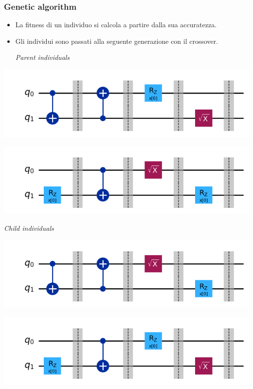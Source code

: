 \documentclass{beamer}
\begin{document}
\begin{frame}
  \frametitle{Genetic algorithm}
  \begin{itemize}
    \item La fitness di un individuo si calcola a partire dalla sua accuratezza.
    \item Gli individui sono passati alla seguente generazione con il crossover.
    \vspace{0.5cm}

  \centering \textit{Parent individuals}    \,\,\,\,\,\,\,
  \end{itemize}
  \begin{minipage}{0.5\textwidth}
    \centering
    \includegraphics[width=\textwidth]{images/parent1.png}
\end{minipage}%
\begin{minipage}{0.5\textwidth}
    \centering
    \includegraphics[width=\textwidth]{images/parent2.png}
\end{minipage}

\vspace{0.5cm}
\centering \textit{Child individuals}
\begin{minipage}{0.5\textwidth}
    \centering
    \includegraphics[width=\textwidth]{images/child1.png}
\end{minipage}%
\begin{minipage}{0.5\textwidth}
    \centering
    \includegraphics[width=\textwidth]{images/child2.png}
\end{minipage}

\end{frame}
\end{document}
